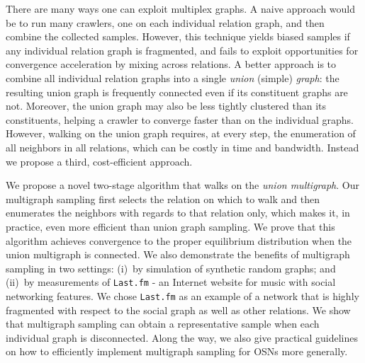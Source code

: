 \documentclass[10pt, conference]{./IEEEtran}
\begin{document}
There are many ways one can exploit multiplex graphs.
A naive approach would be to run many crawlers, one on each individual relation graph, and then combine the collected samples. However, this technique yields biased samples %
if any individual relation graph is fragmented, and fails to exploit opportunities for convergence acceleration by mixing across relations. A better approach is to combine all individual relation graphs into a single \emph{union} (simple) \emph{graph}: the resulting union graph is frequently connected even if its constituent graphs are not. Moreover, the union graph may also be less tightly clustered than its constituents, helping a crawler to converge faster than on the individual graphs.
However, walking on the union graph requires, at every step, the enumeration of all neighbors in all relations, which can be costly in time and bandwidth. Instead we propose a third, cost-efficient approach.

We propose a novel two-stage algorithm that walks on the \emph{union multigraph}. Our multigraph sampling first selects the relation on which to walk and then enumerates the neighbors with regards to that relation only, which makes it, in practice, even more efficient than union graph sampling. We prove that this algorithm achieves convergence to the proper equilibrium distribution when the union multigraph is connected.
We also demonstrate the benefits of multigraph sampling in two settings:
(i)~by simulation of synthetic random graphs; and
(ii)~by measurements of {\tt Last.fm} - an Internet website for music with social networking features.
We chose {\tt Last.fm} as an example of a network that is highly fragmented with respect to the social graph as well as other relations. We show that multigraph sampling can obtain a representative sample when each individual graph is disconnected.  Along the way, we also give practical guidelines on how to efficiently implement multigraph sampling for OSNs more generally.
\end{document}
